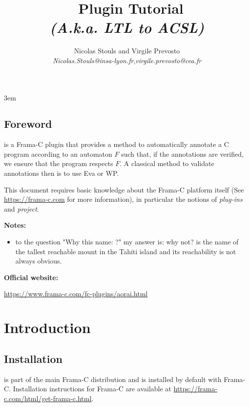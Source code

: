 \documentclass{frama-c-book}
\title{\aorai\ Plugin Tutorial\\\textit{\normalsize (A.k.a. LTL to ACSL)}}
\author{Nicolas Stouls and Virgile Prevosto\\
\small\textit{Nicolas.Stouls@insa-lyon.fr},\textit{virgile.prevosto@cea.fr}}
\begin{document}
\sloppy
\emergencystretch 3em

\maketitle

\section*{Foreword}
\aorai is a Frama-C plugin that provides a method to automatically annotate a
C program according to an automaton $F$ such that, if the annotations
are verified, we ensure that the program respects $F$. A classical method to
validate annotations then is to use Eva or WP.

This document requires basic knowledge about
the Frama-C platform itself (See \url{https://frama-c.com} for more information),
in particular the notions of {\it plug-ins} and {\it project}.

\vspace*{20pt}
\noindent \textbf{Notes:}
\begin{itemize}
  \item to the question "Why this name: \textit{\aorai}?"
    my answer is: why not? \aorai is the name of the tallest reachable
    mount in the Tahiti island and its reachability is not always obvious.
\end{itemize}

\vspace*{20pt}
\noindent \textbf{Official website:}

\begin{center}
  \url{https://www.frama-c.com/fc-plugins/aorai.html}
\end{center}

\tableofcontents

\chapter{Introduction}
\section{Installation}

\aorai is part of the main Frama-C distribution and is installed by default
with Frama-C. Installation instructions for Frama-C are available at
\url{https://frama-c.com/html/get-frama-c.html}.
\end{document}
